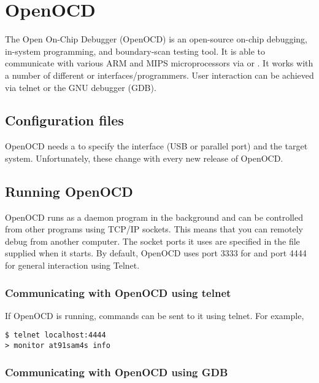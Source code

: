 \chapter{OpenOCD}

The Open On-Chip Debugger (OpenOCD) is an open-source on-chip
debugging, in-system programming, and boundary-scan testing tool. It
is able to communicate with various ARM and MIPS microprocessors via
 or . It works with a number of different
 or  interfaces/programmers. User
interaction can be achieved via telnet or the GNU debugger (GDB).

\section{Configuration files}
\label{configuration-files}

OpenOCD needs a  to
specify the interface (USB or parallel port) and the target system.
Unfortunately, these change with every new release of OpenOCD.

\section{Running OpenOCD}
\label{running-openocd}

OpenOCD runs as a daemon program in the background and can be controlled
from other programs using TCP/IP sockets. This means that you can
remotely debug from another computer. The socket ports it uses are
specified in the 
file supplied when it starts. By default, OpenOCD uses port 3333 for
 and port 4444 for general interaction using Telnet.

\subsection{Communicating with OpenOCD using telnet}
\label{communicating-with-openocd-using-telnet}

If OpenOCD is running, commands can be sent to it using telnet. For
example,

\begin{verbatim}
$ telnet localhost:4444
> monitor at91sam4s info
\end{verbatim}

\subsection{Communicating with OpenOCD using GDB}
\label{communicating-with-openocd-using-gdb}

